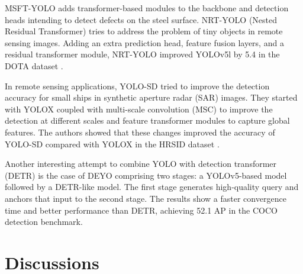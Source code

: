 \documentclass{article}
\begin{document}
MSFT-YOLO \cite{guo2022msft} adds transformer-based modules to the backbone and detection heads intending to detect defects on the steel surface. NRT-YOLO \cite{liu2022nrt} (Nested Residual Transformer) tries to address the problem of tiny objects in remote sensing images. Adding an extra prediction head, feature fusion layers, and a residual transformer module, NRT-YOLO improved YOLOv5l by 5.4 in the DOTA dataset \cite{xia2018dota}.

In remote sensing applications, YOLO-SD \cite{wang2022yolo} tried to improve the detection accuracy for small ships in synthetic aperture radar (SAR) images. They started with YOLOX \cite{ge2021yolox} coupled with multi-scale convolution (MSC) to improve the detection at different scales and feature transformer modules to capture global features. The authors showed that these changes improved the accuracy of YOLO-SD compared with YOLOX in the HRSID dataset \cite{wei2020hrsid}.

Another interesting attempt to combine YOLO with detection transformer (DETR) \cite{carion2020end} is the case of DEYO \cite{ouyang2022deyo} comprising two stages: a YOLOv5-based model followed by a DETR-like model. The first stage generates high-quality query and anchors that input to the second stage. The results show a faster convergence time and better performance than DETR, achieving 52.1 AP in the COCO detection benchmark.






\section{Discussions}
\end{document}
